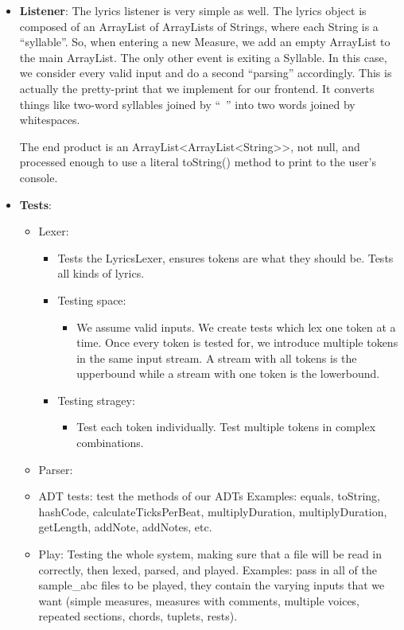 \documentclass[12pt]{book}
\begin{document}
\begin{itemize}
\item {\bf Listener}: The lyrics listener is very simple as well. The lyrics object is composed of an ArrayList of ArrayLists of Strings, where each String is a ``syllable''. So, when entering a new Measure, we add an empty ArrayList to the main ArrayList. The only other event is exiting a Syllable. In this case, we consider every valid input and do a second ``parsing'' accordingly. This is actually the pretty-print that we implement for our frontend. It converts things like two-word syllables joined by ``~'' into two words joined by whitespaces.

The end product is an ArrayList<ArrayList<String>>, not null, and processed enough to use a literal toString() method to print to the user's console.

\item {\bf Tests}:
\begin{itemize}
\item Lexer:
\begin{itemize}
\item Tests the LyricsLexer, ensures tokens are what they should be. Tests all kinds of lyrics.

\item Testing space:

\begin{itemize} 
\item We assume valid inputs. We create tests which lex one token at a time. Once every token is tested for, we introduce multiple tokens in the same input stream. A stream with all tokens is the upperbound while a stream with one token is the lowerbound.
\end{itemize}

\item Testing stragey:

\begin{itemize}
\item Test each token individually. Test multiple tokens in complex combinations.
\end{itemize}
\end{itemize}

\item Parser: 


\item ADT tests: test the methods of our ADTs
Examples: equals, toString, hashCode, calculateTicksPerBeat, multiplyDuration, multiplyDuration, getLength, addNote, addNotes, etc.
\item Play: Testing the whole system, making sure that a file will be read in correctly, then lexed, parsed, and played.
Examples: pass in all of the sample\_abc files to be played, they contain the varying inputs that we want (simple measures, measures with comments, multiple voices, repeated sections, chords, tuplets, rests).
\end{itemize}

\end{itemize}

\newpage
\end{document}
